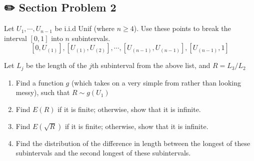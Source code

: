\documentclass[
  letterpaper,
  DIV=11,
  numbers=noendperiod]{scrreprt}
\theoremstyle{plain}
\theoremstyle{definition}
\theoremstyle{remark}
\begin{document}
\hypertarget{section-problem-2-2}{%
\subsection*{✏️ Section Problem 2}\label{section-problem-2-2}}

Let \(U_{1}, \cdots, U_{n-1}\) be i.i.d Unif (where \(n \geq 4\)). Use
these points to break the interval \([0,1]\) into \(n\) subintervals.
\[[0, U_{(1)}], [U_{(1)}, U_{(2)}], \cdots, [U_{(n-1)}, U_{(n-1)}], [U_{(n-1)}, 1]\]

Let \(L_j\) be the length of the \(j\)th subinterval from the above
list, and \(R=L_3/L_2\)

\begin{enumerate}
\def\labelenumi{(\alph{enumi})}
\item
  Find a function \(g\) (which takes on a very simple from rather than
  looking messy), such that \(R\sim g(U_1)\)
\item
  Find \(E(R)\) if it is finite; otherwise, show that it is infinite.
\item
  Find \(E(\sqrt{R})\) if it is finite; otherwise, show that it is
  infinite.
\item
  Find the distribution of the difference in length between the longest
  of these subintervals and the second longest of these subintervals.
\end{enumerate}
\end{document}
